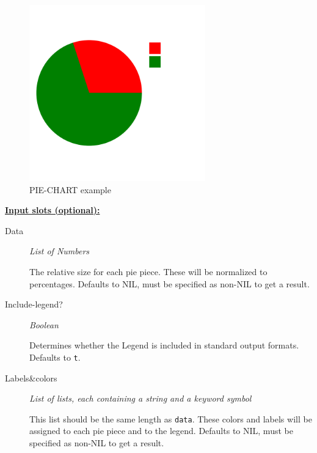 \documentclass [11pt]{book}
\begin{document}
\begin{itemize}
\begin{figure}
\begin{center}
\includegraphics[width=3in,height=3in]{../images/example-pie-chart.pdf}
\end{center}

\caption{PIE-CHART example}

\label{fig:PIE-CHART}

\end{figure}





\textbf{
\underline{Input slots (optional):}}

\begin{description}

\item [Data]
\emph{List of Numbers}

 The relative size for each pie piece. These will be normalized to percentages.
Defaults to NIL, must be specified as non-NIL to get a result.




\item [Include-legend?]
\emph{Boolean}

 Determines whether the Legend is included in standard output formats. Defaults to \texttt{t}.




\item [Labels\&colors]
\emph{List of lists, each containing a string and a keyword symbol}

 This list should be the same
length as \texttt{data}. These colors and labels will be assigned to each pie piece and to the legend.
Defaults to NIL, must be specified as non-NIL to get a result.





\end{description}
\end{itemize}
\end{document}
